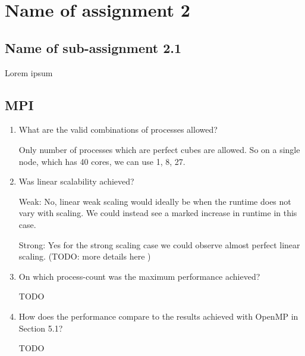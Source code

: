 \documentclass{article}
\begin{document}

\section{Name of assignment 2}
\subsection{Name of sub-assignment 2.1}
Lorem ipsum

\subsection{MPI}
\begin{enumerate}
	\item{What are the valid combinations of processes allowed?

	Only number of processes which are perfect cubes are allowed. So on a single node, which has 40 cores, we can use 1, 8, 27.
	}

	\item{Was linear scalability achieved?

	Weak: No, linear weak scaling would ideally be when the runtime does not vary with scaling. We could instead see a marked increase in runtime in this case.

	Strong: Yes for the strong scaling case we could observe almost perfect linear scaling. (TODO: more details here )
	}
	\item{On which process-count was the maximum performance achieved?

	TODO
	}
	\item{How does the performance compare to the results achieved with OpenMP in Section 5.1?

	TODO
	}
\end{enumerate}
\end{document}
